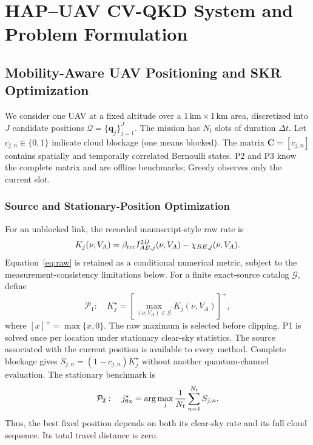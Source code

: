 \section{HAP--UAV CV-QKD System and Problem Formulation}
\label{sec:system}
\subsection{Mobility-Aware UAV Positioning and SKR Optimization}
We consider one UAV at a fixed altitude over a $1\,\mathrm{km}\times
1\,\mathrm{km}$ area, discretized into $J$ candidate positions
$\mathcal Q=\{\mathbf q_j\}_{j=1}^J$. The mission has $N_t$ slots of
duration $\Delta t$. Let $c_{j,n}\in\{0,1\}$ indicate cloud blockage
(one means blocked). The matrix $\mathbf C=[c_{j,n}]$ contains spatially
and temporally correlated Bernoulli states. P2 and P3 know the complete
matrix and are offline benchmarks; Greedy observes only the current slot.

\subsubsection{Source and Stationary-Position Optimization}
For an unblocked link, the recorded manuscript-style raw rate is
\begin{equation}
 K_j(\nu,V_A)=\beta_{\rm rec}I_{AB,j}^{2D}(\nu,V_A)-\chi_{BE,j}(\nu,V_A).
 \label{eq:raw}
\end{equation}
Equation~\eqref{eq:raw} is retained as a conditional numerical metric,
subject to the measurement-consistency limitations below. For a finite
exact-source catalog $\mathcal G$, define
\begin{equation}
 \mathcal P_1:\quad K_j^\star=
 \left[\max_{(\nu,V_A)\in\mathcal G}K_j(\nu,V_A)\right]^+,
 \label{eq:p1}
\end{equation}
where $[x]^+=\max\{x,0\}$. The raw maximum is selected before clipping.
P1 is solved once per location under stationary clear-sky statistics.
The source associated with the current position is available to every
method. Complete blockage gives $S_{j,n}=(1-c_{j,n})K_j^\star$ without
another quantum-channel evaluation. The stationary benchmark is
\begin{equation}
 \mathcal P_2:\quad j_{\rm fix}^\star=
 \arg\max_j\frac{1}{N_t}\sum_{n=1}^{N_t}S_{j,n}.
 \label{eq:p2}
\end{equation}
Thus, the best fixed position depends on both its clear-sky rate and its
full cloud sequence. Its total travel distance is zero.

